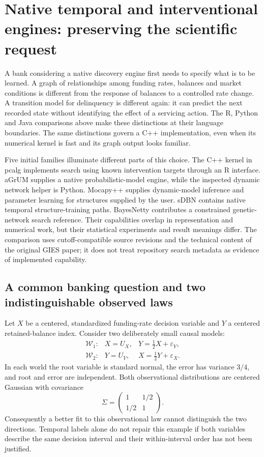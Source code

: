 \section{Native temporal and interventional engines: preserving the scientific request}
\label{exec16:cxx-temporal}

A bank considering a native discovery engine first needs to specify what is
to be learned. A graph of relationships among funding rates, balances and
market conditions is different from the response of balances to a controlled
rate change. A transition model for delinquency is different again: it can
predict the next recorded state without identifying the effect of a servicing
action. The R, Python and Java comparisons above make these distinctions at
their language boundaries. The same distinctions govern a C++ implementation,
even when its numerical kernel is fast and its graph output looks familiar.

Five initial families illuminate different parts of this choice. The C++ kernel in
pcalg implements search using known intervention targets through an R interface.
aGrUM supplies a native probabilistic-model engine, while the inspected dynamic
network helper is Python. Mocapy++ supplies dynamic-model inference and parameter
learning for structures supplied by the user. sDBN contains native temporal
structure-training paths. BayesNetty contributes a constrained genetic-network
search reference. Their capabilities overlap in representation and numerical
work, but their statistical experiments and result meanings differ.
The comparison uses cutoff-compatible source revisions and the technical
content of the original GIES paper; it does not treat repository search
metadata as evidence of implemented capability. \citep{exec16_ct_pcalg,exec16_ct_agrum,exec16_ct_mocapy,exec16_ct_sdbn,exec16_ct_bayesnetty,exec14_pt_paper_gies}

\subsection{A common banking question and two indistinguishable observed laws}

Let $X$ be a centered, standardized funding-rate decision variable and $Y$ a
centered retained-balance index. Consider two deliberately small causal models:
\[
 \begin{array}{lll}
 \mathcal W_1:&X=U_X,&Y=\tfrac12X+\varepsilon_Y,\\
 \mathcal W_2:&Y=U_Y,&X=\tfrac12Y+\varepsilon_X.
 \end{array}
\]
In each world the root variable is standard normal, the error has variance
$3/4$, and root and error are independent. Both observational distributions
are centered Gaussian with covariance
\[
 \Sigma=\begin{pmatrix}1&1/2\\1/2&1\end{pmatrix}.
\]
Consequently a better fit to this observational law cannot distinguish the
two directions. Temporal labels alone do not repair this example if both
variables describe the same decision interval and their within-interval order
has not been justified.

